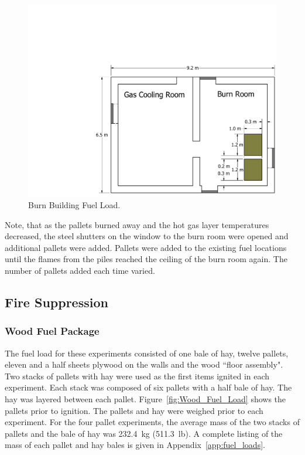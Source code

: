 \documentclass[12pt,oneside]{book}
\begin{document}
\begin{figure}[!ht]
	\includegraphics[width=\columnwidth]{../Figures/Floor_Plans/PDFs/West_Structure/DelCo_2012_West_Structure_Pallets}
	\caption{Burn Building Fuel Load.}
	\label{fig:Burn_Building_Fuel_Load}
\end{figure}

Note, that as the pallets burned away and the hot gas layer temperatures decreased, the steel shutters on the window to the burn room were opened and additional pallets were added. Pallets were added to the existing fuel locations until the flames from the piles reached the ceiling of the burn room again. The number of pallets added each time varied.

\clearpage

\subsection{Fire Suppression}
\label{sec:Fuel_Load_Fire_Suppression}

\subsubsection{Wood Fuel Package}
\label{sec:fire_suppression_pallet_fuel}

The fuel load for these experiments consisted of one bale of hay, twelve pallets, eleven and a half sheets plywood on the walls and the wood ``floor assembly". Two stacks of pallets with hay were used as the first items ignited in each experiment. Each stack was composed of six pallets with a half bale of hay. The hay was layered between each pallet. Figure~\ref{fig:Wood_Fuel_Load} shows the pallets prior to ignition. The pallets and hay were weighed prior to each experiment. For the four pallet experiments, the average mass of the two stacks of pallets and the bale of hay was 232.4~kg (511.3~lb). A complete listing of the mass of each pallet and hay bales is given in Appendix~\ref{app:fuel_loads}.
\end{document}
